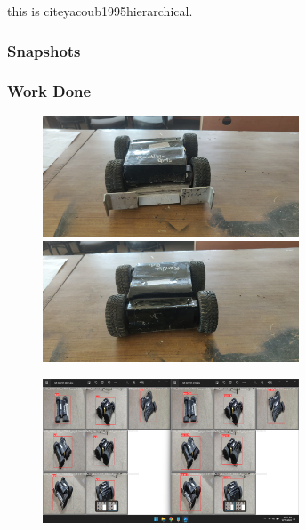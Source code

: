 this is cite{yacoub1995hierarchical}.\cite{yacoub1995hierarchical}
\renewcommand\bibname{References} %





\newpage
\subsubsection{Snapshots}
\subsubsection{Work Done}
\begin{figure}[!th] %
	\includegraphics[width = 3in]{images/botpic10.jpg} 
	\hspace{.5cm}
	\includegraphics[width = 3in]{images/botpic11.jpg} 
	\label{figSample1} %

	\includegraphics[width = 3in]{images/botlap.png} 
	\label{figSample1} %
\end{figure}

